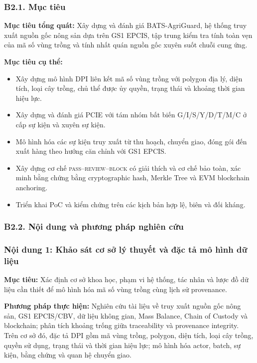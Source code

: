 \documentclass[letterpaper,11pt]{article}
\begin{document}
\subsubsection*{B2.1. Mục tiêu}
\textbf{Mục tiêu tổng quát:} Xây dựng và đánh giá BATS-AgriGuard, hệ thống truy xuất nguồn gốc nông sản dựa trên GS1 EPCIS, tập trung kiểm tra tính toàn vẹn của mã số vùng trồng và tính nhất quán nguồn gốc xuyên suốt chuỗi cung ứng.

\textbf{Mục tiêu cụ thể:}
\begin{itemize}
  \item Xây dựng mô hình DPI liên kết mã số vùng trồng với polygon địa lý, diện tích, loại cây trồng, chủ thể được ủy quyền, trạng thái và khoảng thời gian hiệu lực.
  \item Xây dựng và đánh giá PCIE với tám nhóm bất biến G/I/S/Y/D/T/M/C ở cấp sự kiện và xuyên sự kiện.
  \item Mô hình hóa các sự kiện truy xuất từ thu hoạch, chuyển giao, đóng gói đến xuất hàng theo hướng căn chỉnh với GS1 EPCIS.
  \item Xây dựng cơ chế \textsc{pass}--\textsc{review}--\textsc{block} có giải thích và cơ chế bảo toàn, xác minh bằng chứng bằng cryptographic hash, Merkle Tree và EVM blockchain anchoring.
  \item Triển khai PoC và kiểm chứng trên các kịch bản hợp lệ, biên và đối kháng.
\end{itemize}

\subsubsection*{B2.2. Nội dung và phương pháp nghiên cứu}
\subsubsection*{Nội dung 1: Khảo sát cơ sở lý thuyết và đặc tả mô hình dữ liệu}
\textbf{Mục tiêu:} Xác định cơ sở khoa học, phạm vi hệ thống, tác nhân và lược đồ dữ liệu cần thiết để mô hình hóa mã số vùng trồng cùng lịch sử provenance.

\textbf{Phương pháp thực hiện:} Nghiên cứu tài liệu về truy xuất nguồn gốc nông sản, GS1 EPCIS/CBV, dữ liệu không gian, Mass Balance, Chain of Custody và blockchain; phân tích khoảng trống giữa traceability và provenance integrity. Trên cơ sở đó, đặc tả DPI gồm mã vùng trồng, polygon, diện tích, loại cây trồng, quyền sử dụng, trạng thái và thời gian hiệu lực; mô hình hóa actor, batch, sự kiện, bằng chứng và quan hệ chuyển giao.
\end{document}
